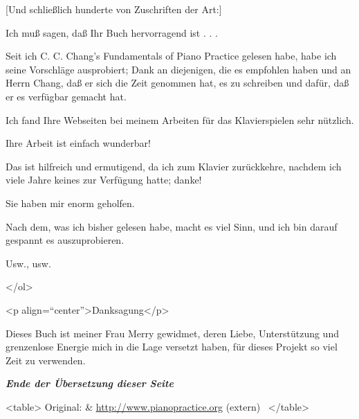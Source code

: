 \item \hypertarget{testimonials25}{}
[Und schließlich hunderte von Zuschriften der Art:]

Ich muß sagen, daß Ihr Buch hervorragend ist . . .

Seit ich C. C. Chang's Fundamentals of Piano Practice gelesen habe, habe ich seine Vorschläge ausprobiert; Dank an diejenigen, die es empfohlen haben und an Herrn Chang, daß er sich die Zeit genommen hat, es zu schreiben und dafür, daß er es verfügbar gemacht hat.

Ich fand Ihre Webseiten bei meinem Arbeiten für das Klavierspielen sehr nützlich.

Ihre Arbeit ist einfach wunderbar!

Das ist hilfreich und ermutigend, da ich zum Klavier zurückkehre, nachdem ich viele Jahre keines zur Verfügung hatte; danke!

Sie haben mir enorm geholfen.

Nach dem, was ich bisher gelesen habe, macht es viel Sinn, und ich bin darauf gespannt es auszuprobieren.

Usw., usw.


</ol> 



<p align=\enquote{center}>Danksagung</p>

Dieses Buch ist meiner Frau Merry gewidmet, deren Liebe, Unterstützung und grenzenlose Energie mich in die Lage versetzt haben, für dieses Projekt so viel Zeit zu verwenden.
 

\textbf{\textit{Ende der Übersetzung dieser Seite}}

<table>
 Original: & \hyperref[http://www.pianopractice.org]{http://www.pianopractice.org} (extern) \ 
</table>





